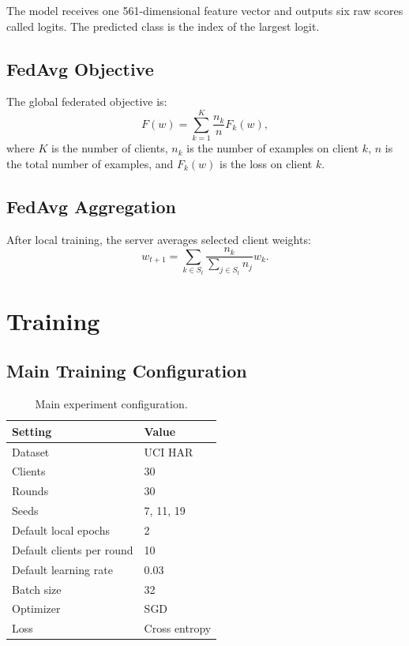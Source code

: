 \documentclass{article}
\begin{document}
The model receives one 561-dimensional feature vector and outputs six raw scores called logits. The predicted class is the index of the largest logit.

\subsection{FedAvg Objective}
The global federated objective is:
\[
F(w)=\sum_{k=1}^{K}\frac{n_k}{n}F_k(w),
\]
where \(K\) is the number of clients, \(n_k\) is the number of examples on client \(k\), \(n\) is the total number of examples, and \(F_k(w)\) is the loss on client \(k\).

\subsection{FedAvg Aggregation}
After local training, the server averages selected client weights:
\[
w_{t+1}=\sum_{k \in S_t}\frac{n_k}{\sum_{j \in S_t}n_j}w_k.
\]

\section{Training}

\subsection{Main Training Configuration}
\begin{table}[H]
\centering
\begin{tabular}{ll}
\toprule
Setting & Value \\
\midrule
Dataset & UCI HAR \\
Clients & 30 \\
Rounds & 30 \\
Seeds & 7, 11, 19 \\
Default local epochs & 2 \\
Default clients per round & 10 \\
Default learning rate & 0.03 \\
Batch size & 32 \\
Optimizer & SGD \\
Loss & Cross entropy \\
\bottomrule
\end{tabular}
\caption{Main experiment configuration.}
\end{table}
\end{document}
